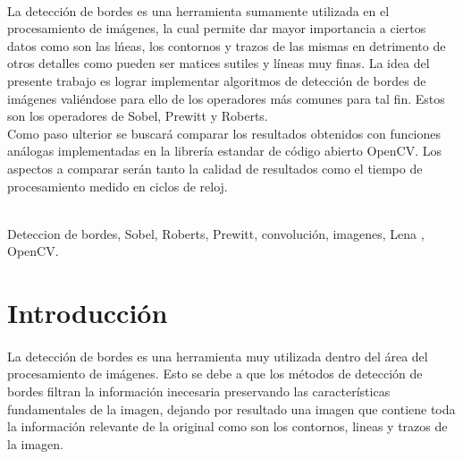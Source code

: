 \documentclass[11pt, a4paper]{article}
\begin{document}
{\small
{}\\
La detecci\'on de bordes es una herramienta sumamente utilizada en el procesamiento de im\'agenes, la cual permite dar mayor importancia a ciertos datos como son las l\'neas, los contornos y trazos de las mismas en detrimento de otros detalles como pueden ser matices sutiles y l\'ineas muy finas. La idea del presente trabajo es lograr implementar algoritmos de detecci\'on de bordes de im\'agenes vali\'endose para ello de los operadores m\'as comunes para tal fin. Estos son los operadores de Sobel, Prewitt y Roberts.\\
Como paso ulterior se buscar\'a comparar los resultados obtenidos con funciones an\'alogas implementadas en la librer\'ia estandar de c\'odigo abierto OpenCV. Los aspectos a comparar ser\'an tanto la calidad de resultados como el tiempo de
procesamiento medido en ciclos de reloj.\\

\vspace{22 pt}

\\
Deteccion de bordes, Sobel, Roberts, Prewitt, convoluci\'on, imagenes, Lena , OpenCV.
}


\newpage



\section{Introducci\'on}

\paragraph{}
La detecci\'on de bordes es una herramienta muy utilizada dentro del \'area del procesamiento de im\'agenes. Esto se debe a que los m\'etodos de detecci\'on de bordes filtran la informaci\'on inecesaria preservando las caracter\'isticas fundamentales de la imagen, dejando por resultado una imagen que contiene toda la informaci\'on relevante de la original como son los contornos, lineas y trazos de la imagen.
\end{document}
